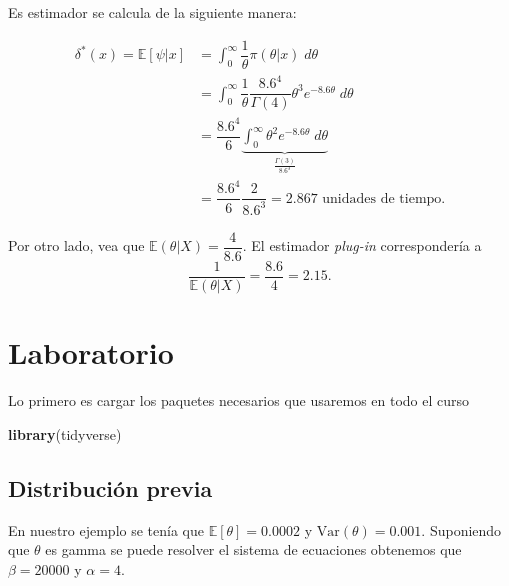 \documentclass[
  12pt,
]{book}
\newenvironment{Shaded}{\begin{snugshade}}{\end{snugshade}}
\newcommand{\KeywordTok}[1]{\textcolor[rgb]{0.13,0.29,0.53}{\textbf{#1}}}
\newcommand{\NormalTok}[1]{#1}
\begin{document}
Es estimador se calcula de la siguiente manera:

\begin{align*}
\delta^*(x) = \mathbb{E}[\psi|x] & = \int_{0}^\infty \dfrac{1}\theta\pi(\theta|x)\;d\theta\\
& = \int_{0}^\infty \dfrac{1}\theta \dfrac{8.6^4}{\Gamma(4)} \theta^3e^{-8.6\theta}\;d\theta\\
&=\dfrac{8.6^4}{6} \underbrace{\int_{0}^\infty \theta^2 e^{-8.6\theta}\;d\theta}_{\frac{\Gamma(3)}{8.6^3}}\\
& = \dfrac{8.6^4}{6}\dfrac{2}{8.6^3} = 2.867 \text{ unidades de tiempo.}
\end{align*}

Por otro lado, vea que \(\mathbb{E}(\theta|X) = \dfrac{4}{8.6}\). El estimador \emph{plug-in} correspondería a
\[\dfrac{1}{\mathbb{E}(\theta|X)} = \dfrac{8.6}{4} = 2.15.\]

\hypertarget{laboratorio}{%
\section{Laboratorio}\label{laboratorio}}

Lo primero es cargar los paquetes necesarios que usaremos en todo el curso

\begin{Shaded}
\begin{Highlighting}[]
\KeywordTok{library}\NormalTok{(tidyverse)}
\end{Highlighting}
\end{Shaded}

\hypertarget{distribuciuxf3n-previa}{%
\subsection{Distribución previa}\label{distribuciuxf3n-previa}}

En nuestro ejemplo se tenía que \(\mathbb E [\theta] = 0.0002\) y \(\mathrm{Var}(\theta) = 0.001\). Suponiendo que \(\theta\) es gamma se puede resolver el sistema de ecuaciones obtenemos que \(\beta=20000\) y \(\alpha=4\).
\end{document}
